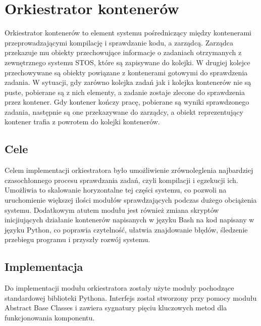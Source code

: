 \section{Orkiestrator kontenerów}
Orkiestrator kontenerów to element systemu pośredniczący między kontenerami przeprowadzającymi kompilację i sprawdzanie kodu, a zarządcą. Zarządca przekazuje mu obiekty przechowujące informacje o zadaniach otrzymanych z zewnętrznego systemu STOS, które są zapisywane do kolejki. W drugiej kolejce przechowywane są obiekty powiązane z kontenerami gotowymi do sprawdzenia zadania. W sytuacji, gdy zarówno kolejka zadań jak i kolejka kontenerów nie są puste, pobierane są z nich elementy, a zadanie zostaje zlecone do sprawdzenia przez kontener. Gdy kontener kończy pracę, pobierane są wyniki sprawdzonego zadania, następnie są one przekazywane do zarządcy, a obiekt reprezentujący kontener trafia z powrotem do kolejki kontenerów.

\subsection{Cele}
Celem implementacji orkiestratora było umożliwienie zrównoleglenia najbardziej czasochłonnego procesu sprawdzania zadań, czyli kompilacji i egzekucji ich. Umożliwia to skalowanie horyzontalne tej części systemu, co pozwoli na uruchomienie większej ilości modułów sprawdzających podczas dużego obciążenia systemu. Dodatkowym atutem modułu jest również zmiana skryptów inicjiujących działanie kontenerów napisanych w języku Bash na kod napisany w języku Python, co poprawia czytelność, ułatwia znajdowanie błędów, śledzenie przebiegu programu i przyszły rozwój systemu.


\subsection{Implementacja}
Do implementacji modułu orkiestratora zostały użyte moduły pochodzące standardowej biblioteki Pythona. Interfejs został stworzony przy pomocy modułu Abstract Base Classes\cite{pythonAbc} i zawiera sygnatury pięciu kluczowych metod dla funkcjonowania komponentu. 

